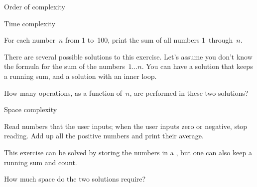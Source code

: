 
 {Order of complexity}

 {Time complexity}
\label{sec:time_complex}

\begin{exercise}
  For each number~$n$ from 1 to~100, print the sum of all numbers 1~through~$n$.
\end{exercise}

There are several possible solutions to this exercise. Let's assume
you don't know the formula for the sum of the numbers~$1\ldots n$.
You can have a solution that keeps a running sum, and a solution with
an inner loop.

\begin{exercise}
  How many operations, as a function of~$n$, are performed in these
  two solutions?
\end{exercise}

 {Space complexity}

\begin{exercise}
  Read numbers that the user inputs; when the user inputs zero or
  negative, stop reading. Add up all the positive numbers
  and print their average. 
\end{exercise}

This exercise can be solved by storing the numbers in a
, but one can also keep a running sum and count.

\begin{exercise}
  How much space do the two solutions require?
\end{exercise}
